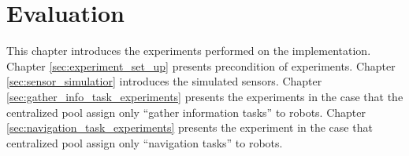 







\chapter{Evaluation}
\label{ch:evaluation}

This chapter introduces the experiments performed on the implementation. 
Chapter \ref{sec:experiment_set_up} presents precondition of experiments.
Chapter \ref{sec:sensor_simulatior} introduces the simulated sensors.
Chapter \ref{sec:gather_info_task_experiments} presents the experiments in the case that the centralized pool assign only ``gather information tasks'' to robots.
Chapter \ref{sec:navigation_task_experiments} presents the experiment in the case that centralized pool assign only ``navigation tasks'' to robots. 

